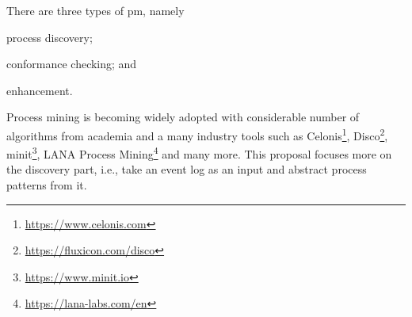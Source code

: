 
There are three types of \gls{pm}, namely \begin{inparaenum}[\itshape i)]
	\item process discovery;
	\item conformance checking; and
	\item enhancement.
\end{inparaenum}
Process mining is becoming widely adopted with considerable number of algorithms from academia and a many industry tools such as Celonis\footnote{\url{https://www.celonis.com}}, Disco\footnote{\url{https://fluxicon.com/disco}}, minit\footnote{\url{https://www.minit.io}}, LANA Process Mining\footnote{\url{https://lana-labs.com/en}} and many more. 
This proposal focuses more on the discovery part, i.e., take an event log as an input and abstract process patterns from it. 


%	
%	
%	
%	


